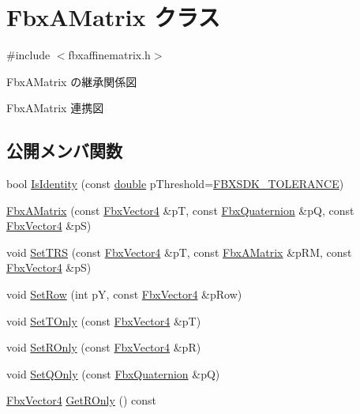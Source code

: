 \hypertarget{class_fbx_a_matrix}{}\section{Fbx\+A\+Matrix クラス}
\label{class_fbx_a_matrix}


{\ttfamily \#include $<$fbxaffinematrix.\+h$>$}



Fbx\+A\+Matrix の継承関係図


Fbx\+A\+Matrix 連携図
\subsection*{公開メンバ関数}
\begin{DoxyCompactItemize}
\item 
bool \hyperlink{class_fbx_a_matrix_a785479d012314ec71198811c172ada98}{Is\+Identity} (const \hyperlink{class_fbx_a_matrix_ad463edbb9fea344643297701f159faa7}{double} p\+Threshold=\hyperlink{fbxtypes_8h_acf3cd6f208edb42ad9c9abbc1f7feea0}{F\+B\+X\+S\+D\+K\+\_\+\+T\+O\+L\+E\+R\+A\+N\+CE})
\item 
\hyperlink{class_fbx_a_matrix_aa8b1d55b46b3ef0298a55a9d64306f23}{Fbx\+A\+Matrix} (const \hyperlink{class_fbx_vector4}{Fbx\+Vector4} \&pT, const \hyperlink{class_fbx_quaternion}{Fbx\+Quaternion} \&pQ, const \hyperlink{class_fbx_vector4}{Fbx\+Vector4} \&pS)
\item 
void \hyperlink{class_fbx_a_matrix_ac3672896ac261b719176c423a46da152}{Set\+T\+RS} (const \hyperlink{class_fbx_vector4}{Fbx\+Vector4} \&pT, const \hyperlink{class_fbx_a_matrix}{Fbx\+A\+Matrix} \&p\+RM, const \hyperlink{class_fbx_vector4}{Fbx\+Vector4} \&pS)
\item 
void \hyperlink{class_fbx_a_matrix_a32ff707b8787c70a4cc4cf1c41c4caed}{Set\+Row} (int pY, const \hyperlink{class_fbx_vector4}{Fbx\+Vector4} \&p\+Row)
\item 
void \hyperlink{class_fbx_a_matrix_a69402e45f1b26360ac8e1f9e0dc6606c}{Set\+T\+Only} (const \hyperlink{class_fbx_vector4}{Fbx\+Vector4} \&pT)
\item 
void \hyperlink{class_fbx_a_matrix_abd514a59ce83ace8acf4d96bb1566c9e}{Set\+R\+Only} (const \hyperlink{class_fbx_vector4}{Fbx\+Vector4} \&pR)
\item 
void \hyperlink{class_fbx_a_matrix_acfba7a0ab3ab718ff1dc95e083bc5f31}{Set\+Q\+Only} (const \hyperlink{class_fbx_quaternion}{Fbx\+Quaternion} \&pQ)
\item 
\hyperlink{class_fbx_vector4}{Fbx\+Vector4} \hyperlink{class_fbx_a_matrix_a908a407eab72b8d71cf6c6ab9fa32e4f}{Get\+R\+Only} () const

\end{DoxyCompactItemize}
